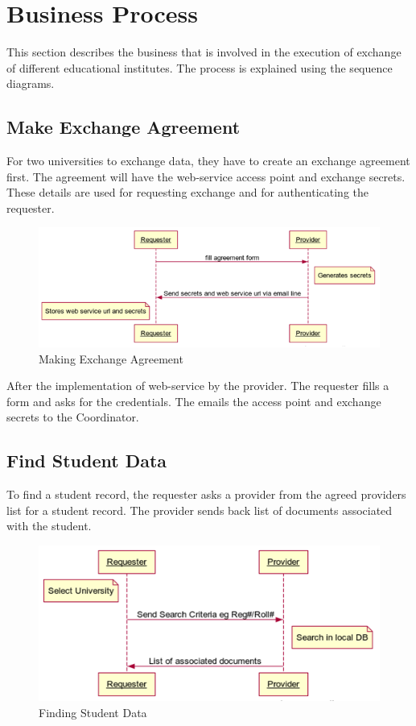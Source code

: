 \documentclass[12pt,a4paper,oneside]{book}
\begin{document}
\section{Business Process}\label{s-business_process}
This section describes the business that is involved in the execution of exchange of different educational institutes. The process is explained using the sequence diagrams.

    \subsection{Make Exchange Agreement}
    For two universities to exchange data, they have to create an exchange agreement first. The agreement will have the web-service access point and exchange secrets. These details are used for requesting exchange and for authenticating the requester.

\begin{figure}[!htp]
  \centering
  \includegraphics[width=14cm]{sq_agreement.png}
  \caption{Making Exchange Agreement}
  \label{fig:sq_agreement}
\end{figure}


After the implementation of web-service by the provider. The requester fills a form and asks for the credentials. The emails the access point and exchange secrets to the Coordinator.

    \subsection{Find Student Data}
    To find a student record, the requester asks a provider from the agreed providers list for a student record. The provider sends back list of documents associated with the student.

\begin{figure}[!hbp]
  \centering
  \includegraphics[width=14cm]{sq_find_student_data.png}
  \caption{Finding Student Data}
  \label{fig:sq_find_student_data}
\end{figure}
\end{document}
